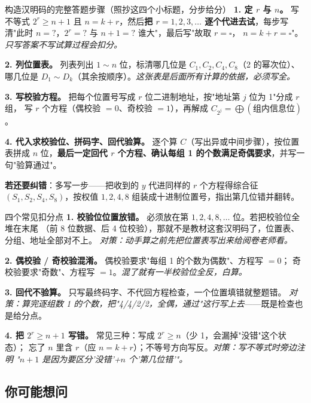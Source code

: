 \begin{exam}{构造汉明码的完整答题步骤（照抄这四个小标题，分步给分）}
\textbf{1. 定 $r$ 与 $n$。} 写不等式 $2^{r}\ge n+1$ 且 $n=k+r$，然后\textbf{把 $r=1,2,3,\dots$
逐个代进去试}，每步写清"此时 $n=?$，$2^{r}=?$ 与 $n+1=?$ 谁大"，最后写"故取 $r=\square$，
$n=k+r=\square$"。\emph{只写答案不写试算过程会扣分。}

\textbf{2. 列位置表。} 列表列出 $1\sim n$ 位，标清哪几位是 $C_1,C_2,C_4,C_8$（2 的幂次位）、
哪几位是 $D_1\sim D_k$（其余按顺序）。\emph{这张表是后面所有计算的依据，必须写全。}

\textbf{3. 写校验方程。} 把每个位置号写成 $r$ 位二进制地址，按"地址第 $j$ 位为 1"分成 $r$ 组，
写 $r$ 个方程（偶校验 $=0$、奇校验 $=1$），再解成 $C_{2^{j}}=\bigoplus(\text{组内信息位})$。

\textbf{4. 代入求校验位、拼码字、回代验算。} 逐个算 $C$（写出异或中间步骤），按位置表拼成
$n$ 位，\textbf{最后一定回代 $r$ 个方程、确认每组 1 的个数满足奇偶要求}，并写一句"验算通过"。

\medskip
\textbf{若还要纠错}：多写一步——把收到的 $y$ 代进同样的 $r$ 个方程得综合征
$(S_{1},S_{2},S_{4},S_{8})$，按权值 $1,2,4,8$ 组装成十进制位置号，指出第几位错并翻转。
\end{exam}

\begin{exam}{四个常见扣分点}
\textbf{1. 校验位位置放错。} 必须放在第 $1,2,4,8,\dots$ 位。若把校验位全堆在末尾
（前 8 位数据、后 4 位校验），那就不是教材这套汉明码了，位置表、分组、地址全部对不上。
\emph{对策：动手算之前先把位置表写出来给阅卷老师看。}

\textbf{2. 偶校验 / 奇校验混淆。} 偶校验要求"每组 1 的个数为偶数"、方程写 $=0$；
奇校验要求"奇数"、方程写 $=1$。\emph{混了就有一半校验位全反，白算。}

\textbf{3. 回代不验算。} 只写最终码字、不代回方程检查，一个位置填错就整题错。
\emph{对策：算完逐组数 1 的个数，把"4/4/2/2，全偶，通过"这行写上去}——既是检查也是给分点。

\textbf{4. 把 $2^{r}\ge n+1$ 写错。} 常见三种：写成 $2^{r}\ge n$（少 1，会漏掉"没错"这个状态）；
忘了 $n$ 里含 $r$（应 $n=k+r$）；不等号方向写反。\emph{对策：写不等式时旁边注明
"$n+1$ 是因为要区分'没错'+$n$ 个'第几位错'"。}
\end{exam}

\subsection{你可能想问}

